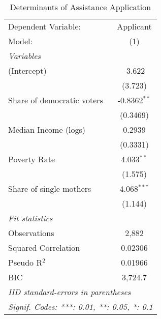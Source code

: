 
\begin{table}[htbp]
   \centering
   \caption{\label{ResultsLogit} Determinants of Assistance Application}
   \begin{tabular}{lc}
      \tabularnewline\midrule\midrule
      Dependent Variable:        & Applicant\\
      Model:                     & (1)\\
      \midrule \emph{Variables} &  \\
      (Intercept)                & -3.622\\
                                 & (3.723)\\
      Share of democratic voters & -0.8362$^{**}$\\
                                 & (0.3469)\\
      Median Income (logs)       & 0.2939\\
                                 & (0.3331)\\
      Poverty Rate               & 4.033$^{**}$\\
                                 & (1.575)\\
      Share of single mothers    & 4.068$^{***}$\\
                                 & (1.144)\\
      \midrule \emph{Fit statistics} &  \\
      Observations               & 2,882\\
      Squared Correlation        & 0.02306\\
      Pseudo R$^2$               & 0.01966\\
      BIC                        & 3,724.7\\
      \midrule\midrule\multicolumn{2}{l}{\emph{IID standard-errors in parentheses}}\\
      \multicolumn{2}{l}{\emph{Signif. Codes: ***: 0.01, **: 0.05, *: 0.1}}\\
   \end{tabular}
\end{table}


